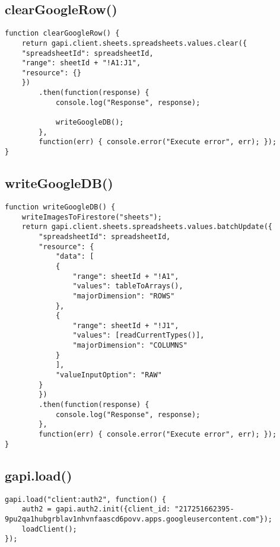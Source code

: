 \documentclass[letterpaper]{article}
\begin{document}
\subsection{clearGoogleRow()}

\begin{lstlisting}[firstnumber=180]
function clearGoogleRow() {
    return gapi.client.sheets.spreadsheets.values.clear({
    "spreadsheetId": spreadsheetId,
    "range": sheetId + "!A1:J1",
    "resource": {}
    })
        .then(function(response) {
            console.log("Response", response);

            writeGoogleDB();
        },
        function(err) { console.error("Execute error", err); });
}
\end{lstlisting}

\subsection{writeGoogleDB()}

\begin{lstlisting}[firstnumber=194]
function writeGoogleDB() {
    writeImagesToFirestore("sheets");
    return gapi.client.sheets.spreadsheets.values.batchUpdate({
        "spreadsheetId": spreadsheetId,
        "resource": {
            "data": [
            {
                "range": sheetId + "!A1",
                "values": tableToArrays(),
                "majorDimension": "ROWS"
            },
            {
                "range": sheetId + "!J1",
                "values": [readCurrentTypes()],
                "majorDimension": "COLUMNS"
            }
            ],
            "valueInputOption": "RAW"
        }
        })
        .then(function(response) {
            console.log("Response", response);
        },
        function(err) { console.error("Execute error", err); });
}
\end{lstlisting}

\subsection{gapi.load()}

\begin{lstlisting}[firstnumber=220]
gapi.load("client:auth2", function() {
    auth2 = gapi.auth2.init({client_id: "217251662395-9pu2qa1hubgrblav1nhvnfaascd6povv.apps.googleusercontent.com"});
    loadClient();
});
\end{lstlisting}

\newpage
\end{document}
